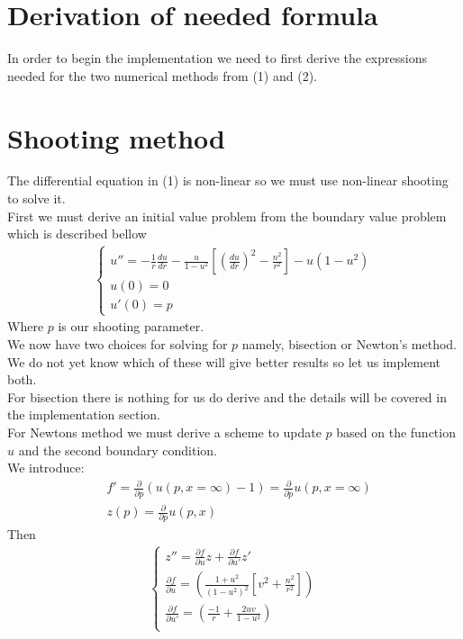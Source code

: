\documentclass{article}
\begin{document}
\section{Derivation of needed formula}
In order to begin the implementation we need to first derive the expressions needed for the two numerical methods from (1) and (2).
\section{Shooting method}
The differential equation in (1) is non-linear so we must use non-linear shooting to solve it. \\
First we must derive an initial value problem from the boundary value problem which is described bellow 
\begin{align}
\begin{cases}
u'' = -\frac{1}{r}\frac{du}{dr} - \frac{u}{1-u^2}\left[\left(\frac{du}{dr}\right)^2 - \frac{n^2}{r^2}\right] - u(1-u^2) \\
u(0) = 0 \\
u'(0) = p
\end{cases}
\end{align}
Where $p$ is our shooting parameter. \\
We now have two choices for solving for $p$ namely, bisection or Newton's method. 
We do not yet know which of these will give better results so let us implement both.  \\
For bisection there is nothing for us do derive and the details will be covered in the implementation section. \\
For Newtons method we must derive a scheme to update $p$ based on the function $u$ and the second boundary condition.\\ 
We introduce:
\begin{align}
&f' = \frac{\partial }{\partial p}\left(u(p,x=\infty)-1\right) =  \frac{\partial }{\partial p} u(p,x=\infty) \\
&z(p) = \frac{\partial }{\partial p} u(p,x)
\end{align}
Then 
\begin{align}
\begin{cases}
z'' = \frac{\partial f}{\partial u}z + \frac{\partial f}{\partial u'}z' \\
 \frac{\partial f}{\partial u} = \left(\frac{1+u^2}{(1-u^2)^2}\left[ v^2 + \frac{n^2}{r^2} \right] \right)\\
 \frac{\partial f}{\partial u'} =  \left(\frac{-1}{r} + \frac{2uv}{1-u^2}\right)\\
\end{cases}
\end{align}
\end{document}
